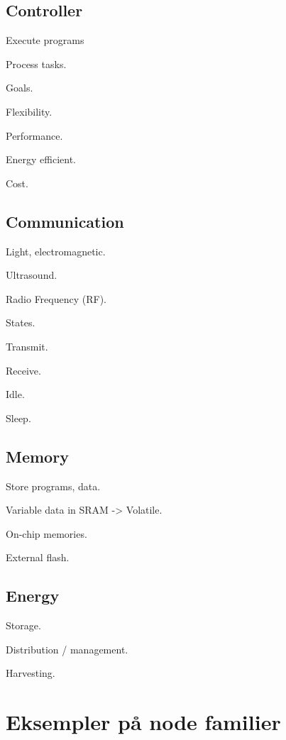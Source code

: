 \subsection{Controller}

\begin{description}
\item Execute programs
\item Process tasks.
\end{description}

Goals.

\begin{description}
\item Flexibility.
\item Performance.
\item Energy efficient.
\item Cost.
\end{description}

\subsection{Communication}
\begin{description}
\item Light, electromagnetic.
\item Ultrasound.
\item Radio Frequency (RF).
\end{description}

States.
\begin{description}
\item Transmit.
\item Receive.
\item Idle.
\item Sleep.
\end{description}

\subsection{Memory}

\begin{description}
\item Store programs, data.
\item Variable data in SRAM -> Volatile.
\item On-chip memories.
\item External flash.
\end{description}

\subsection{Energy}
\begin{description}
\item Storage.
\item Distribution / management.
\item Harvesting.
\end{description}
\section{Eksempler på node familier}



